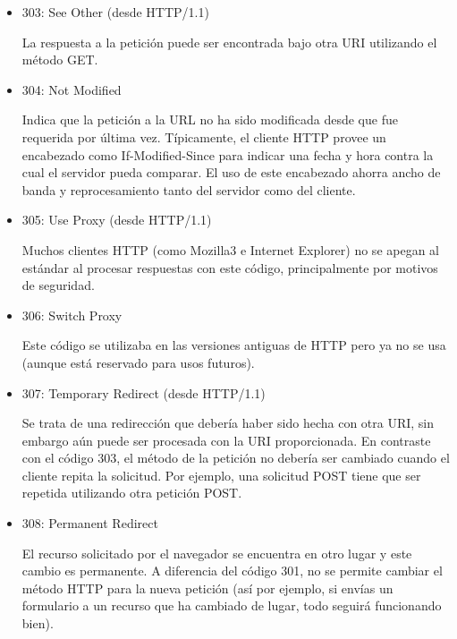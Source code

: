 \documentclass[a4paper,10pt]{article}
\begin{document}
\begin{enumerate}
\begin{enumerate}
\begin{itemize}
\begin{itemize}
                            \item 303: See Other (desde HTTP/1.1)

                            La respuesta a la petición puede ser encontrada bajo otra URI utilizando el método GET.

                            \item 304: Not Modified

                            Indica que la petición a la URL no ha sido modificada desde que fue requerida por última vez. Típicamente, el cliente HTTP provee un encabezado como If-Modified-Since para indicar una fecha y hora contra la cual el servidor pueda comparar. El uso de este encabezado ahorra ancho de banda y reprocesamiento tanto del servidor como del cliente.

                            \item 305: Use Proxy (desde HTTP/1.1)

                            Muchos clientes HTTP (como Mozilla3 e Internet Explorer) no se apegan al estándar al procesar respuestas con este código, principalmente por motivos de seguridad.

                            \item 306: Switch Proxy

                            Este código se utilizaba en las versiones antiguas de HTTP pero ya no se usa (aunque está reservado para usos futuros).

                            \item 307: Temporary Redirect (desde HTTP/1.1)

                            Se trata de una redirección que debería haber sido hecha con otra URI, sin embargo aún puede ser procesada con la URI proporcionada. En contraste con el código 303, el método de la petición no debería ser cambiado cuando el cliente repita la solicitud. Por ejemplo, una solicitud POST tiene que ser repetida utilizando otra petición POST.

                            \item 308: Permanent Redirect

                            El recurso solicitado por el navegador se encuentra en otro lugar y este cambio es permanente. A diferencia del código 301, no se permite cambiar el método HTTP para la nueva petición (así por ejemplo, si envías un formulario a un recurso que ha cambiado de lugar, todo seguirá funcionando bien).
                        \end{itemize}


\end{itemize}
\end{enumerate}
\end{enumerate}
\end{document}
